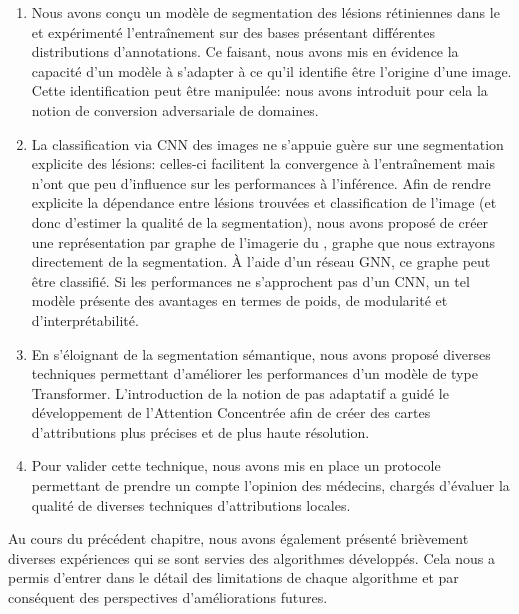 \begin{enumerate}
	\item Nous avons conçu un modèle de segmentation des lésions rétiniennes dans le \fundus{} et expérimenté l'entraînement sur des bases présentant différentes distributions d'annotations. Ce faisant, nous avons mis en évidence la capacité d'un modèle à s'adapter à ce qu'il identifie être l'origine d'une image. Cette identification peut être manipulée: nous avons introduit pour cela la notion de conversion adversariale de domaines.
	\item La classification via CNN des images ne s'appuie guère sur une segmentation explicite des lésions: celles-ci facilitent la convergence à l'entraînement mais n'ont que peu d'influence sur les performances à l'inférence. Afin de rendre explicite la dépendance entre lésions trouvées et classification de l'image (et donc d'estimer la qualité de la segmentation), nous avons proposé de créer une représentation par graphe de l'imagerie du \fundus{}, graphe que nous extrayons directement de la segmentation. À l'aide d'un réseau GNN, ce graphe peut être classifié. Si les performances ne s'approchent pas d'un CNN, un tel modèle présente des avantages en termes de poids, de modularité et d'interprétabilité.
	\item En s'éloignant de la segmentation sémantique, nous avons proposé diverses techniques permettant d'améliorer les performances d'un modèle de type Transformer. L'introduction de la notion de pas adaptatif a guidé le développement de l'Attention Concentrée afin de créer des cartes d'attributions plus précises et de plus haute résolution.
	\item Pour valider cette technique, nous avons mis en place un protocole permettant de prendre un compte l'opinion des médecins, chargés d'évaluer la qualité de diverses techniques d'attributions locales.
\end{enumerate}
Au cours du précédent chapitre, nous avons également présenté brièvement diverses expériences qui se sont servies des algorithmes développés. Cela nous a permis d'entrer dans le détail des limitations de chaque algorithme et par conséquent des perspectives d'améliorations futures.


